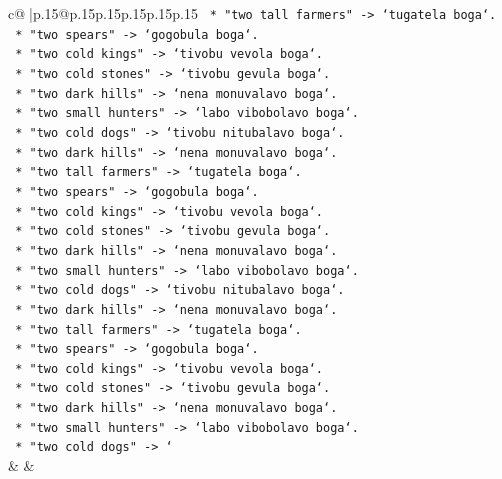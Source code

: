 \documentclass{article}
\begin{document}
{\begin{supertabular}{c@{$\;$}|p{.15\linewidth}@{}p{.15\linewidth}p{.15\linewidth}p{.15\linewidth}p{.15\linewidth}p{.15\linewidth}}
{{{\texttt{        *   "two tall farmers" {-}> `tugatela boga`.} \\
\texttt{        *   "two spears" {-}> `gogobula boga`.} \\
\texttt{        *   "two cold kings" {-}> `tivobu vevola boga`.} \\
\texttt{        *   "two cold stones" {-}> `tivobu gevula boga`.} \\
\texttt{        *   "two dark hills" {-}> `nena monuvalavo boga`.} \\
\texttt{        *   "two small hunters" {-}> `labo vibobolavo boga`.} \\
\texttt{        *   "two cold dogs" {-}> `tivobu nitubalavo boga`.} \\
\texttt{        *   "two dark hills" {-}> `nena monuvalavo boga`.} \\
\texttt{        *   "two tall farmers" {-}> `tugatela boga`.} \\
\texttt{        *   "two spears" {-}> `gogobula boga`.} \\
\texttt{        *   "two cold kings" {-}> `tivobu vevola boga`.} \\
\texttt{        *   "two cold stones" {-}> `tivobu gevula boga`.} \\
\texttt{        *   "two dark hills" {-}> `nena monuvalavo boga`.} \\
\texttt{        *   "two small hunters" {-}> `labo vibobolavo boga`.} \\
\texttt{        *   "two cold dogs" {-}> `tivobu nitubalavo boga`.} \\
\texttt{        *   "two dark hills" {-}> `nena monuvalavo boga`.} \\
\texttt{        *   "two tall farmers" {-}> `tugatela boga`.} \\
\texttt{        *   "two spears" {-}> `gogobula boga`.} \\
\texttt{        *   "two cold kings" {-}> `tivobu vevola boga`.} \\
\texttt{        *   "two cold stones" {-}> `tivobu gevula boga`.} \\
\texttt{        *   "two dark hills" {-}> `nena monuvalavo boga`.} \\
\texttt{        *   "two small hunters" {-}> `labo vibobolavo boga`.} \\
\texttt{        *   "two cold dogs" {-}> `} \\
            }
        }
    }
    & & \\ \\


\end{supertabular}}
\end{document}
